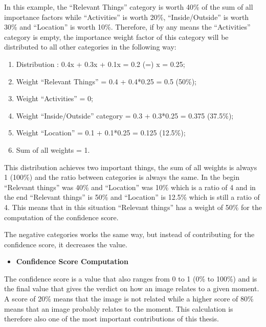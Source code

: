    In this example, the \enquote{Relevant Things} category is worth 40\% of the sum of all importance factors while \enquote{Activities} is worth 20\%, \enquote{Inside/Outside} is worth 30\% and \enquote{Location} is worth 10\%. Therefore, if by any means the \enquote{Activities} category is empty, the importance weight factor of this category will be distributed to all other categories in the following way:

   \begin{enumerate}
    \item Distribution : 0.4x + 0.3x + 0.1x = 0.2 (=) x = 0.25;
    \item Weight \enquote{Relevant Things} = 0.4 + 0.4*0.25 = 0.5 (50\%);
    \item Weight \enquote{Activities} = 0;
    \item Weight \enquote{Inside/Outside} category = 0.3 + 0.3*0.25 = 0.375 (37.5\%);
    \item Weight \enquote{Location} =  0.1 + 0.1*0.25 = 0.125 (12.5\%);
    \item Sum of all weights = 1.
   \end{enumerate}


   This distribution achieves two important things, the sum of all weights is always 1 (100\%) and the ratio between categories is always the same. In the begin \enquote{Relevant things} was 40\% and \enquote{Location} was 10\%  which is a ratio of 4 and in the end \enquote{Relevant things} is 50\% and \enquote{Location} is 12.5\% which is still a ratio of 4. This means that in this situation \enquote{Relevant things} has a weight of 50\% for the computation of the confidence score.
   
   The negative categories works the same way, but instead of contributing for the confidence score, it decreases the value.

    

    \begin{itemize}
      \item \textbf{Confidence Score Computation}
    \end{itemize}

    The confidence score is a value that also ranges from 0 to 1 (0\% to 100\%) and is the final value that gives the verdict on how an image relates to a given moment. A score of 20\% means that the image is not related while a higher score of 80\% means that an image probably relates to the moment. This calculation is therefore also one of the most important contributions of this thesis.

